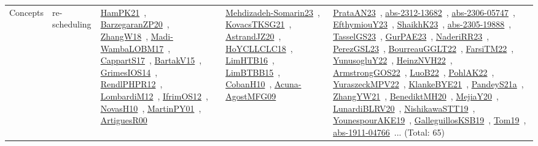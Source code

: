 {\begin{longtable}{lp{3cm}>{\raggedright\arraybackslash}p{6cm}>{\raggedright\arraybackslash}p{6cm}>{\raggedright\arraybackslash}p{8cm}}
Concepts & re-scheduling & \href{works/HamPK21.pdf}{HamPK21}~\cite{HamPK21}, \href{works/BarzegaranZP20.pdf}{BarzegaranZP20}~\cite{BarzegaranZP20}, \href{works/ZhangW18.pdf}{ZhangW18}~\cite{ZhangW18}, \href{works/Madi-WambaLOBM17.pdf}{Madi-WambaLOBM17}~\cite{Madi-WambaLOBM17}, \href{works/CappartS17.pdf}{CappartS17}~\cite{CappartS17}, \href{works/BartakV15.pdf}{BartakV15}~\cite{BartakV15}, \href{works/GrimesIOS14.pdf}{GrimesIOS14}~\cite{GrimesIOS14}, \href{works/RendlPHPR12.pdf}{RendlPHPR12}~\cite{RendlPHPR12}, \href{works/LombardiM12.pdf}{LombardiM12}~\cite{LombardiM12}, \href{works/IfrimOS12.pdf}{IfrimOS12}~\cite{IfrimOS12}, \href{works/NovasH10.pdf}{NovasH10}~\cite{NovasH10}, \href{works/MartinPY01.pdf}{MartinPY01}~\cite{MartinPY01}, \href{works/ArtiguesR00.pdf}{ArtiguesR00}~\cite{ArtiguesR00} & \href{works/Mehdizadeh-Somarin23.pdf}{Mehdizadeh-Somarin23}~\cite{Mehdizadeh-Somarin23}, \href{works/KovacsTKSG21.pdf}{KovacsTKSG21}~\cite{KovacsTKSG21}, \href{works/AstrandJZ20.pdf}{AstrandJZ20}~\cite{AstrandJZ20}, \href{works/HoYCLLCLC18.pdf}{HoYCLLCLC18}~\cite{HoYCLLCLC18}, \href{works/LimHTB16.pdf}{LimHTB16}~\cite{LimHTB16}, \href{works/LimBTBB15.pdf}{LimBTBB15}~\cite{LimBTBB15}, \href{works/CobanH10.pdf}{CobanH10}~\cite{CobanH10}, \href{works/Acuna-AgostMFG09.pdf}{Acuna-AgostMFG09}~\cite{Acuna-AgostMFG09} & \href{works/PrataAN23.pdf}{PrataAN23}~\cite{PrataAN23}, \href{works/abs-2312-13682.pdf}{abs-2312-13682}~\cite{abs-2312-13682}, \href{works/abs-2306-05747.pdf}{abs-2306-05747}~\cite{abs-2306-05747}, \href{works/EfthymiouY23.pdf}{EfthymiouY23}~\cite{EfthymiouY23}, \href{works/ShaikhK23.pdf}{ShaikhK23}~\cite{ShaikhK23}, \href{works/abs-2305-19888.pdf}{abs-2305-19888}~\cite{abs-2305-19888}, \href{works/TasselGS23.pdf}{TasselGS23}~\cite{TasselGS23}, \href{works/GurPAE23.pdf}{GurPAE23}~\cite{GurPAE23}, \href{works/NaderiRR23.pdf}{NaderiRR23}~\cite{NaderiRR23}, \href{works/PerezGSL23.pdf}{PerezGSL23}~\cite{PerezGSL23}, \href{works/BourreauGGLT22.pdf}{BourreauGGLT22}~\cite{BourreauGGLT22}, \href{works/FarsiTM22.pdf}{FarsiTM22}~\cite{FarsiTM22}, \href{works/YunusogluY22.pdf}{YunusogluY22}~\cite{YunusogluY22}, \href{works/HeinzNVH22.pdf}{HeinzNVH22}~\cite{HeinzNVH22}, \href{works/ArmstrongGOS22.pdf}{ArmstrongGOS22}~\cite{ArmstrongGOS22}, \href{works/LuoB22.pdf}{LuoB22}~\cite{LuoB22}, \href{works/PohlAK22.pdf}{PohlAK22}~\cite{PohlAK22}, \href{works/YuraszeckMPV22.pdf}{YuraszeckMPV22}~\cite{YuraszeckMPV22}, \href{works/KlankeBYE21.pdf}{KlankeBYE21}~\cite{KlankeBYE21}, \href{works/PandeyS21a.pdf}{PandeyS21a}~\cite{PandeyS21a}, \href{works/ZhangYW21.pdf}{ZhangYW21}~\cite{ZhangYW21}, \href{works/BenediktMH20.pdf}{BenediktMH20}~\cite{BenediktMH20}, \href{works/MejiaY20.pdf}{MejiaY20}~\cite{MejiaY20}, \href{works/LunardiBLRV20.pdf}{LunardiBLRV20}~\cite{LunardiBLRV20}, \href{works/NishikawaSTT19.pdf}{NishikawaSTT19}~\cite{NishikawaSTT19}, \href{works/YounespourAKE19.pdf}{YounespourAKE19}~\cite{YounespourAKE19}, \href{works/GalleguillosKSB19.pdf}{GalleguillosKSB19}~\cite{GalleguillosKSB19}, \href{works/Tom19.pdf}{Tom19}~\cite{Tom19}, \href{works/abs-1911-04766.pdf}{abs-1911-04766}~\cite{abs-1911-04766}... (Total: 65)\\

\end{longtable}}

